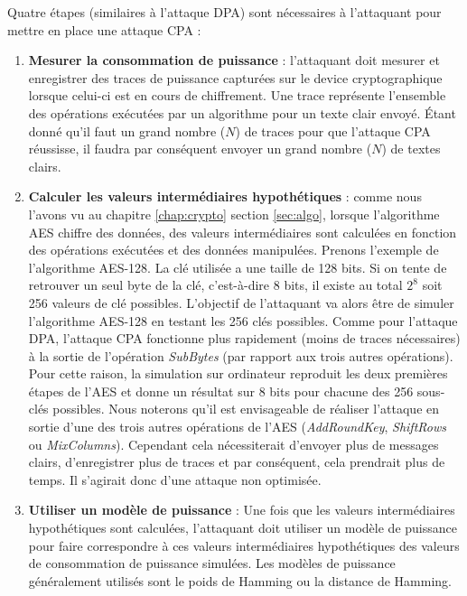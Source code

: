 \documentclass[oneside]{book}
\begin{document}
\newpage

\hspace{-0.5 cm}Quatre étapes (similaires à l'attaque DPA) sont nécessaires à l'attaquant pour mettre en place une attaque CPA : 
\begin{enumerate}
\item \textbf{Mesurer la consommation de puissance} : l'attaquant doit mesurer et enregistrer des traces de puissance capturées sur le device cryptographique lorsque celui-ci est en cours de chiffrement. Une trace représente l'ensemble des opérations exécutées par un algorithme pour un texte clair envoyé. Étant donné qu'il faut un grand nombre ($N$) de traces pour que l'attaque CPA réussisse, il faudra par conséquent envoyer un grand nombre ($N$) de textes clairs.
\item \textbf{Calculer les valeurs intermédiaires hypothétiques} : comme nous l'avons vu au chapitre \ref{chap:crypto} section \ref{sec:algo}, lorsque l'algorithme AES chiffre des données, des valeurs intermédiaires sont calculées en fonction des opérations exécutées et des données manipulées. Prenons l'exemple de l'algorithme AES-128. La clé utilisée a une taille de 128 bits. Si on tente de retrouver un seul byte de la clé, c'est-à-dire 8 bits, il existe au total $2^{8}$ soit 256 valeurs de clé possibles. L'objectif de l'attaquant va alors être de simuler l'algorithme AES-128 en testant les 256 clés possibles. Comme pour l'attaque DPA, l'attaque CPA fonctionne plus rapidement (moins de traces nécessaires) à la sortie de l'opération \textit{SubBytes} (par rapport aux trois autres opérations). Pour cette raison, la simulation sur ordinateur reproduit les deux premières étapes de l’AES et donne un résultat sur 8 bits pour chacune des 256 sous-clés possibles. Nous noterons qu'il est envisageable de réaliser l'attaque en sortie d'une des trois autres opérations de l'AES (\textit{AddRoundKey}, \textit{ShiftRows} ou \textit{MixColumns}). Cependant cela nécessiterait d'envoyer plus de messages clairs, d'enregistrer plus de traces et par conséquent, cela prendrait plus de temps. Il s'agirait donc d'une attaque non optimisée.
\item \textbf{Utiliser un modèle de puissance} : Une fois que les valeurs intermédiaires hypothétiques sont calculées, l'attaquant doit utiliser un modèle de puissance pour faire correspondre à ces valeurs intermédiaires hypothétiques des valeurs de consommation de puissance simulées. Les modèles de puissance généralement utilisés sont le poids de Hamming ou la distance de Hamming.

\end{enumerate}
\end{document}
